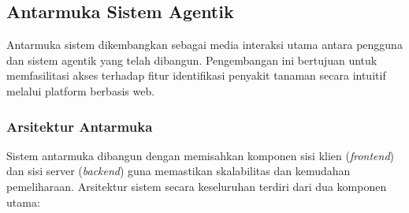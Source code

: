 \begin{table}[H]
    \centering
    \caption{Konfigurasi Parameter Tavily Search API}
    \label{tab:tavily_parameters}
    \small
\end{table}

\subsection{Antarmuka Sistem Agentik}
Antarmuka sistem dikembangkan sebagai media interaksi utama antara pengguna dan sistem agentik yang telah dibangun. Pengembangan ini bertujuan untuk memfasilitasi akses terhadap fitur identifikasi penyakit tanaman secara intuitif melalui platform berbasis web.

\subsubsection{Arsitektur Antarmuka}
Sistem antarmuka dibangun dengan memisahkan komponen sisi klien (\textit{frontend}) dan sisi server (\textit{backend}) guna memastikan skalabilitas dan kemudahan pemeliharaan. Arsitektur sistem secara keseluruhan terdiri dari dua komponen utama:

